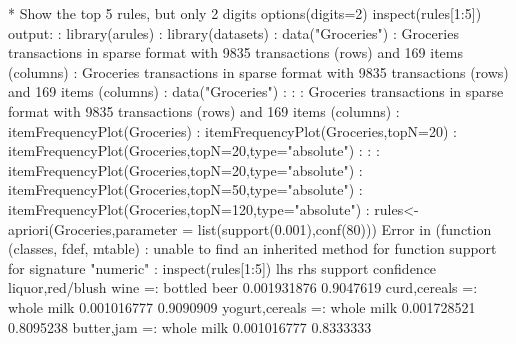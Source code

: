 \documentclass[a4paper,12pt]{article}
\begin{document}
{{* Show the top 5 rules, but only 2 digits
\newline
options(digits=2)
\newline
inspect(rules[1:5])
\newline
output:
\newline
: library(arules)
\newline
: library(datasets)
\newline
: data("Groceries")
\newline
: Groceries
transactions in sparse format with
9835 transactions (rows) and
169 items (columns)
\newline
: Groceries
transactions in sparse format with
9835 transactions (rows) and
169 items (columns)
\newline
: data("Groceries")
\newline
: 
: 
\newline
: Groceries
transactions in sparse format with
9835 transactions (rows) and
169 items (columns)
\newline
: itemFrequencyPlot(Groceries)
\newline
: itemFrequencyPlot(Groceries,topN=20)
\newline
: itemFrequencyPlot(Groceries,topN=20,type="absolute")
\newline
: 
\newline
: 
\newline
: itemFrequencyPlot(Groceries,topN=20,type="absolute")
\newline
: itemFrequencyPlot(Groceries,topN=50,type="absolute")
\newline
: itemFrequencyPlot(Groceries,topN=120,type="absolute")
\newline
: rules<-apriori(Groceries,parameter = list(support(0.001),conf(80)))
Error in (function (classes, fdef, mtable)  : 
unable to find an inherited method for function support for signature "numeric"
\newline
: inspect(rules[1:5])
\newline
lhs                        rhs            support     confidence
 {liquor,red/blush wine} =: {bottled beer} 0.001931876 0.9047619 
 {curd,cereals}          =: {whole milk}   0.001016777 0.9090909 
 {yogurt,cereals}        =: {whole milk}   0.001728521 0.8095238 
 {butter,jam}            =: {whole milk}   0.001016777 0.8333333 
\newline
}}
\end{document}
